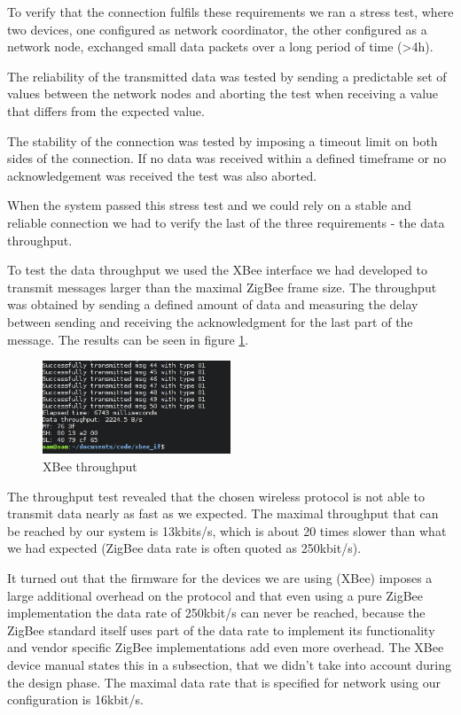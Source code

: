 To verify that the connection fulfils these requirements we ran a stress test, where two devices, one configured as network coordinator, the other configured as a network node, exchanged small data packets over a long period of time (>4h). 

The reliability of the transmitted data was tested by sending a predictable set of values between the network nodes and aborting the test when receiving a value that differs from the expected value. 

The stability of the connection was tested by imposing a timeout limit on both sides of the connection. If no data was received within a defined timeframe or no acknowledgement was received the test was also aborted.

When the system passed this stress test and we could rely on a stable and reliable connection we had to verify the last of the three requirements - the data throughput.

To test the data throughput we used the XBee interface we had developed to transmit messages larger than the maximal ZigBee frame size. The throughput was obtained by sending a defined amount of data and measuring the delay between sending and receiving the acknowledgment for the last part of the message. The results can be seen in figure \ref{fig:xbee_throughput}.

\begin{figure}
\centering
\includegraphics[width=0.5\textwidth]{Images/xbee_throughput}
\caption{XBee throughput}
\label{fig:xbee_throughput}
\end{figure}

The throughput test revealed that the chosen wireless protocol is not able to transmit data nearly as fast as we expected. The maximal throughput that can be reached by our system is 13kbits/s, which is about 20 times slower than what we had expected (ZigBee data rate is often quoted as  250kbit/s). 

It turned out that the firmware for the devices we are using (XBee) imposes a large additional overhead on the protocol and that even using a pure ZigBee implementation the data rate of 250kbit/s can never be reached, because the ZigBee standard itself uses part of the data rate to implement its functionality and vendor specific ZigBee implementations add even more overhead. The XBee device manual states this in a subsection, that we didn’t take into account during the design phase. The maximal data rate that is specified for network using our configuration is 16kbit/s.


